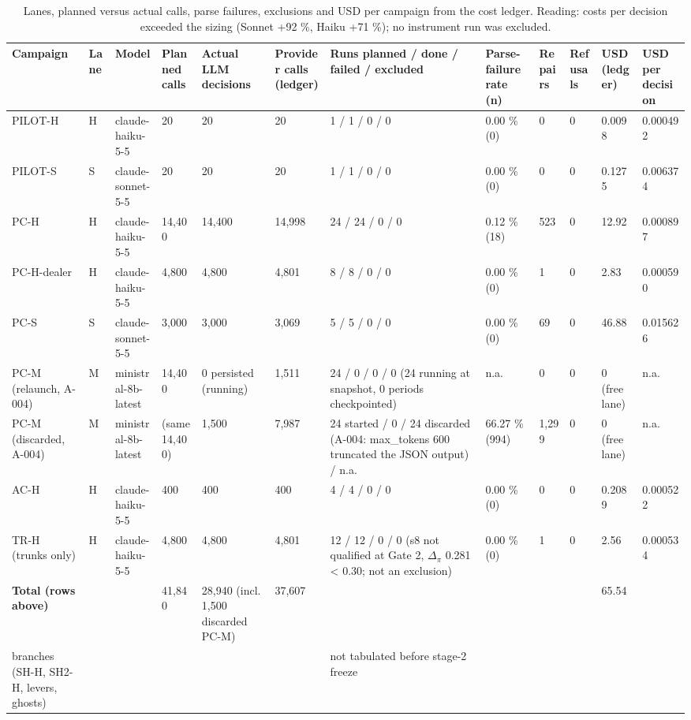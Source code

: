 \documentclass[11pt,a4paper]{article}
\begin{document}
\begin{landscape}
\begin{table}[htbp]
\centering
\renewcommand{\thetable}{B0}
\caption{\scriptsize Lanes, planned versus actual calls, parse failures, exclusions and USD per campaign from the cost ledger. Reading: costs per decision exceeded the sizing (Sonnet +92 \%, Haiku +71 \%); no instrument run was excluded.}
\label{tab:B0}
\scriptsize
\setlength{\tabcolsep}{2pt}
\renewcommand{\arraystretch}{0.85}
\begin{tabularx}{\linewidth}{@{}LLLLLLLLLLLL@{}}
\toprule
Campaign & Lane & Model & Planned calls & Actual LLM decisions & Provider calls (ledger) & Runs planned / done / failed / excluded & Parse-failure rate (n) & Repairs & Refusals & USD (ledger) & USD per decision \\
\midrule
PILOT-H & H & claude-haiku-5-5 & 20 & 20 & 20 & 1 / 1 / 0 / 0 & 0.00 \% (0) & 0 & 0 & 0.0098 & 0.000492 \\
PILOT-S & S & claude-sonnet-5-5 & 20 & 20 & 20 & 1 / 1 / 0 / 0 & 0.00 \% (0) & 0 & 0 & 0.1275 & 0.006374 \\
PC-H & H & claude-haiku-5-5 & 14,400 & 14,400 & 14,998 & 24 / 24 / 0 / 0 & 0.12 \% (18) & 523 & 0 & 12.92 & 0.000897 \\
PC-H-dealer & H & claude-haiku-5-5 & 4,800 & 4,800 & 4,801 & 8 / 8 / 0 / 0 & 0.00 \% (0) & 1 & 0 & 2.83 & 0.000590 \\
PC-S & S & claude-sonnet-5-5 & 3,000 & 3,000 & 3,069 & 5 / 5 / 0 / 0 & 0.00 \% (0) & 69 & 0 & 46.88 & 0.015626 \\
PC-M (relaunch, A-004) & M & ministral-8b-latest & 14,400 & 0 persisted (running) & 1,511 & 24 / 0 / 0 / 0 (24 running at snapshot, 0 periods checkpointed) & n.a. & 0 & 0 & 0 (free lane) & n.a. \\
PC-M (discarded, A-004) & M & ministral-8b-latest & (same 14,400) & 1,500 & 7,987 & 24 started / 0 / 24 discarded (A-004: max\_tokens 600 truncated the JSON output) / n.a. & 66.27 \% (994) & 1,299 & 0 & 0 (free lane) & n.a. \\
AC-H & H & claude-haiku-5-5 & 400 & 400 & 400 & 4 / 4 / 0 / 0 & 0.00 \% (0) & 0 & 0 & 0.2089 & 0.000522 \\
TR-H (trunks only) & H & claude-haiku-5-5 & 4,800 & 4,800 & 4,801 & 12 / 12 / 0 / 0 (s8 not qualified at Gate 2, $\Delta_\pi$ 0.281 < 0.30; not an exclusion) & 0.00 \% (0) & 1 & 0 & 2.56 & 0.000534 \\
\textbf{Total (rows above)} &  &  & 41,840 & 28,940 (incl. 1,500 discarded PC-M) & 37,607 &  &  &  &  & 65.54 &  \\
branches (SH-H, SH2-H, levers, ghosts) &  &  &  &  &  & not tabulated before stage-2 freeze &  &  &  &  &  \\
\bottomrule
\end{tabularx}
\end{table}
\end{landscape}
\end{document}
